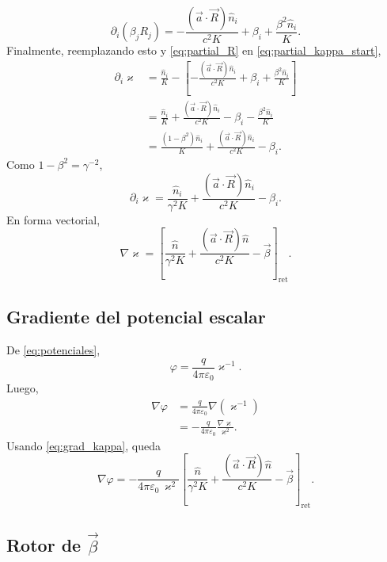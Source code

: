 \documentclass{article}
\numberwithin{equation}{section}
\newcommand{\eps}{\varepsilon_0}
\newcommand{\bv}{\vec{\beta}}
\newcommand{\av}{\vec{a}}
\newcommand{\Rv}{\vec{R}}
\newcommand{\nh}{\hat{n}}
\newcommand{\K}{K}
\begin{document}
\begin{equation*}
  \partial_i(\beta_jR_j)
  =-\frac{(\av\cdot\Rv)\hat{n}_i}{c^2\K}
  +\beta_i+\frac{\beta^2\hat{n}_i}{\K}.
\end{equation*}
Finalmente, reemplazando esto y \eqref{eq:partial_R} en
\eqref{eq:partial_kappa_start},
\begin{align*}
  \partial_i\varkappa
  &=\frac{\hat{n}_i}{\K}
  -\left[-\frac{(\av\cdot\Rv)\hat{n}_i}{c^2\K}
  +\beta_i+\frac{\beta^2\hat{n}_i}{\K}\right] \\
  &=\frac{\hat{n}_i}{\K}
  +\frac{(\av\cdot\Rv)\hat{n}_i}{c^2\K}
  -\beta_i-\frac{\beta^2\hat{n}_i}{\K} \\
  &=\frac{(1-\beta^2)\hat{n}_i}{\K}
  +\frac{(\av\cdot\Rv)\hat{n}_i}{c^2\K}
  -\beta_i.
\end{align*}
Como $1-\beta^2=\gamma^{-2}$,
\begin{equation*}
  \boxed{
  \partial_i\varkappa
  =\frac{\hat{n}_i}{\gamma^2\K}
  +\frac{(\av\cdot\Rv)\hat{n}_i}{c^2\K}
  -\beta_i.
  }
\end{equation*}
En forma vectorial,
\begin{equation}
  \boxed{
  \nabla\varkappa
  =\left[
  \frac{\nh}{\gamma^2\K}
  +\frac{(\av\cdot\Rv)\nh}{c^2\K}
  -\bv
  \right]_{\mathrm{ret}}.
  }
  \label{eq:grad_kappa}
\end{equation}

\subsection{Gradiente del potencial escalar}

De \eqref{eq:potenciales},
\begin{equation*}
  \varphi=\frac{q}{4\pi\eps}\varkappa^{-1}.
\end{equation*}
Luego,
\begin{align*}
  \nabla\varphi
  &=\frac{q}{4\pi\eps}\nabla(\varkappa^{-1}) \\
  &=-\frac{q}{4\pi\eps}\frac{\nabla\varkappa}{\varkappa^2}.
\end{align*}
Usando \eqref{eq:grad_kappa}, queda
\begin{equation}
  \boxed{
  \nabla\varphi
  =-\frac{q}{4\pi\eps\,\varkappa^2}
  \left[
  \frac{\nh}{\gamma^2\K}
  +\frac{(\av\cdot\Rv)\nh}{c^2\K}
  -\bv
  \right]_{\mathrm{ret}}.
  }
  \label{eq:grad_phi}
\end{equation}

\subsection{Rotor de $\bv$}
\end{document}
